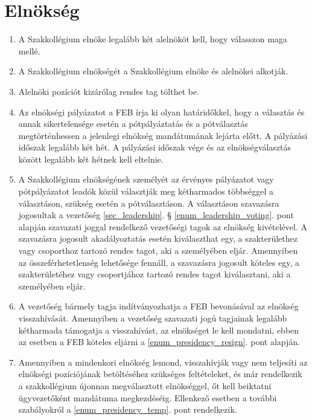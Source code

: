 \documentclass[12pt]{report}
\begin{document}

\section{Elnökség} \label{sec_presidency}

\begin{enumerate}
  \item A Szakkollégium elnöke legalább két alelnököt kell, hogy válasszon maga mellé.
  \item A Szakkollégium elnökségét a Szakkollégium elnöke és alelnökei alkotják.
  \item Alelnöki pozíciót kizárólag rendes tag tölthet be.
  \item Az elnökségi pályázatot a FEB írja ki olyan határidőkkel, hogy a választás és annak sikertelensége esetén a pótpályáztatás 
    és a pótválasztás megtörténhessen a jelenlegi elnökség mandátumának lejárta előtt. A pályázási időszak legalább két hét. 
    A pályázási időszak vége és az elnökségválasztás között legalább két hétnek kell eltelnie.
  \item A Szakkollégium elnökségének személyét az érvényes pályázatot vagy pótpályázatot leadók közül választják meg kétharmados többséggel a választáson, 
    szükség esetén a pótválasztáson. A választáson szavazásra jogosultak a vezetőség \ref{sec_leadership}. § \ref{enum_leadership_voting}. pont alapján szavazati joggal 
    rendelkező vezetőségi tagok az elnökség kivételével. A szavazásra jogosult akadályoztatás esetén kiválaszthat egy, a szakterülethez vagy csoporthoz tartozó rendes tagot, 
    aki a személyében eljár. Amennyiben az összeférhetetlenség lehetősége fennáll, a szavazásra jogosult köteles egy, a szakterületéhez vagy csoportjához 
    tartozó rendes tagot kiválasztani, aki a személyében eljár.
  \item A vezetőség bármely tagja indítványozhatja a FEB bevonásával az elnökség visszahívását. Amennyiben a vezetőség szavazati jogú tagjainak legalább 
    kétharmada támogatja a visszahívást, az elnökséget le kell mondatni, ebben az esetben a FEB köteles eljárni a \ref{enum_presidency_resign}. pont alapján.
  \item Amennyiben a mindenkori elnökség lemond, visszahívják vagy nem teljesíti az elnökségi pozíciójának betöltéséhez szükséges feltételeket, 
    és már rendelkezik a szakkollégium újonnan megválasztott elnökséggel, őt kell beiktatni ügyvezetőként mandátuma megkezdéséig. 
    Ellenkező esetben a további szabályokról a \ref{enum_presidency_temp}. pont rendelkezik. \label{enum_presidency_resign}

\end{enumerate}
\end{document}
